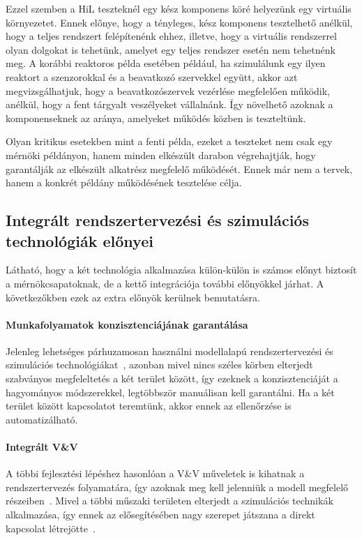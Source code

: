         Ezzel szemben a HiL teszteknél egy kész komponens köré helyezünk egy virtuális környezetet.
        Ennek előnye, hogy a tényleges, kész komponens tesztelhető anélkül, hogy a teljes rendszert felépítenénk ehhez, illetve, hogy a virtuális rendszerrel olyan dolgokat is tehetünk, amelyet egy teljes rendszer esetén nem tehetnénk meg.
        A korábbi reaktoros példa esetében például, ha szimulálunk egy ilyen reaktort a szenzorokkal és a beavatkozó szervekkel együtt, akkor azt megvizsgálhatjuk, hogy a beavatkozószervek vezérlése megfelelően működik, anélkül, hogy a fent tárgyalt veszélyeket vállalnánk.
        Így növelhető azoknak a komponenseknek az aránya, amelyeket működés közben is teszteltünk.
        
        Olyan kritikus esetekben mint a fenti példa, ezeket a teszteket nem csak egy mérnöki példányon, hanem minden elkészült darabon végrehajtják, hogy garantálják az elkészült alkatrész megfelelő működését.
        Ennek már nem a tervek, hanem a konkrét példány működésének tesztelése célja.

    \subsection{Integrált rendszertervezési és szimulációs technológiák előnyei} \label{IntegracioElonyei}
    Látható, hogy a két technológia alkalmazása külön-külön is számos előnyt biztosít a mérnökcsapatoknak, de a kettő integrációja további előnyökkel járhat.
    A következőkben ezek az extra előnyök kerülnek bemutatásra.

        \paragraph{Munkafolyamatok konzisztenciájának garantálása}
        Jelenleg lehetséges párhuzamosan használni modellalapú rendszertervezési és szimulációs technológiákat~\cite{Gianni2017}, azonban mivel nincs széles körben elterjedt szabványos megfeleltetés a két terület között, így ezeknek a konzisztenciáját a hagyományos módszerekkel, legtöbbször manuálisan kell garantálni.
        Ha a két terület között kapcsolatot teremtünk, akkor ennek az ellenőrzése is automatizálható.

        \paragraph{Integrált V\&V}
        A többi fejlesztési lépéshez hasonlóan a V\&V műveletek is kihatnak a rendszertervezés folyamatára, így azoknak meg kell jelenniük a modell megfelelő részeiben~\cite{Bajaj_2022}.
        Mivel a többi műszaki területen elterjedt a szimulációs technikák alkalmazása, így ennek az elősegítésében nagy szerepet játszana a direkt kapcsolat létrejötte~\cite{Ma_2022}.
        
